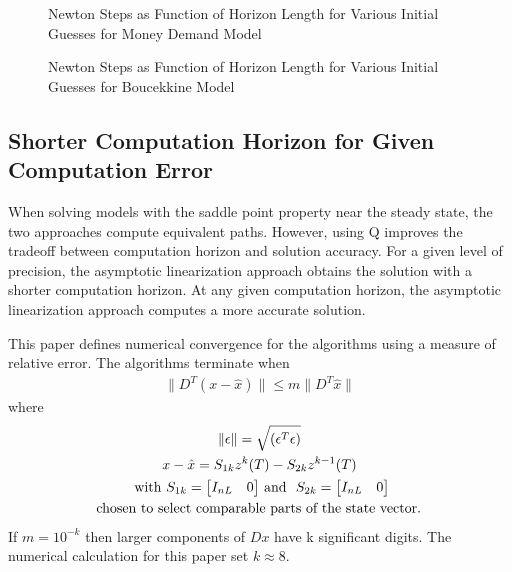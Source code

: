 \documentclass[12pt]{article}
\begin{document}
\begin{figure}[htbp]
  \begin{center}
    \leavevmode
\fbox{
}    \caption{Newton Steps as Function of Horizon Length for Various Initial Guesses for Money Demand Model}
  \label{fig:newtQMon}
  \fbox{
}    \caption{Newton Steps as Function of Horizon Length for Various Initial Guesses for Boucekkine Model}
  \label{fig:newtQBou}
  \end{center}
\end{figure}



\subsection{Shorter Computation Horizon for Given Computation Error}
\label{sec:shorter}

When solving models with the saddle point property
near the steady state,
the two approaches compute equivalent paths.
However, using Q
improves the tradeoff between computation horizon and solution accuracy.
For a given level of precision,
the asymptotic linearization approach obtains the solution
 with a shorter computation horizon.
At any given computation horizon, the asymptotic linearization approach
computes a more accurate solution.


This paper defines  numerical 
convergence for the algorithms
using a measure of relative error.
The algorithms terminate when
\begin{gather*}
  \| D^T (x - \hat{x})\| \le m \| D^T  \hat{x} \|
\end{gather*}
where 
%
%
\begin{gather*}
  \| \epsilon \| = \sqrt{ (\epsilon^T \epsilon)}\\
x-\hat{x} = S_{1k} z^k(T) - S_{2k} z^{k-1}(T)\\
\text{ with 
$ S_{1k} = 
  \begin{bmatrix}
    I_{nL}&0
  \end{bmatrix}
$ and 
$\  S_{2k} = 
  \begin{bmatrix}
    I_{nL}&0
  \end{bmatrix}
$}\\
\text{  chosen to select comparable parts of the state vector. }
\end{gather*}
If $m= 10^{-k}$ then larger components of $D x$ have k significant digits\cite{nag95}. 
The numerical calculation for this paper set $k \approx 8$.
\end{document}
